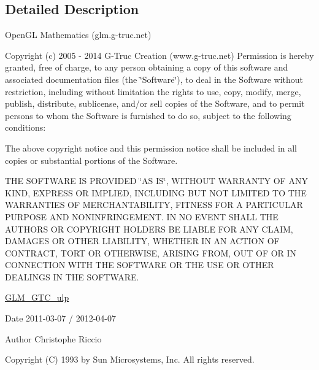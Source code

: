 \begin{DoxyCompactItemize}
\end{DoxyCompactItemize}


\subsection{Detailed Description}
Open\-G\-L Mathematics (glm.\-g-\/truc.\-net)

Copyright (c) 2005 -\/ 2014 G-\/\-Truc Creation (www.\-g-\/truc.\-net) Permission is hereby granted, free of charge, to any person obtaining a copy of this software and associated documentation files (the \char`\"{}\-Software\char`\"{}), to deal in the Software without restriction, including without limitation the rights to use, copy, modify, merge, publish, distribute, sublicense, and/or sell copies of the Software, and to permit persons to whom the Software is furnished to do so, subject to the following conditions\-:

The above copyright notice and this permission notice shall be included in all copies or substantial portions of the Software.

T\-H\-E S\-O\-F\-T\-W\-A\-R\-E I\-S P\-R\-O\-V\-I\-D\-E\-D \char`\"{}\-A\-S I\-S\char`\"{}, W\-I\-T\-H\-O\-U\-T W\-A\-R\-R\-A\-N\-T\-Y O\-F A\-N\-Y K\-I\-N\-D, E\-X\-P\-R\-E\-S\-S O\-R I\-M\-P\-L\-I\-E\-D, I\-N\-C\-L\-U\-D\-I\-N\-G B\-U\-T N\-O\-T L\-I\-M\-I\-T\-E\-D T\-O T\-H\-E W\-A\-R\-R\-A\-N\-T\-I\-E\-S O\-F M\-E\-R\-C\-H\-A\-N\-T\-A\-B\-I\-L\-I\-T\-Y, F\-I\-T\-N\-E\-S\-S F\-O\-R A P\-A\-R\-T\-I\-C\-U\-L\-A\-R P\-U\-R\-P\-O\-S\-E A\-N\-D N\-O\-N\-I\-N\-F\-R\-I\-N\-G\-E\-M\-E\-N\-T. I\-N N\-O E\-V\-E\-N\-T S\-H\-A\-L\-L T\-H\-E A\-U\-T\-H\-O\-R\-S O\-R C\-O\-P\-Y\-R\-I\-G\-H\-T H\-O\-L\-D\-E\-R\-S B\-E L\-I\-A\-B\-L\-E F\-O\-R A\-N\-Y C\-L\-A\-I\-M, D\-A\-M\-A\-G\-E\-S O\-R O\-T\-H\-E\-R L\-I\-A\-B\-I\-L\-I\-T\-Y, W\-H\-E\-T\-H\-E\-R I\-N A\-N A\-C\-T\-I\-O\-N O\-F C\-O\-N\-T\-R\-A\-C\-T, T\-O\-R\-T O\-R O\-T\-H\-E\-R\-W\-I\-S\-E, A\-R\-I\-S\-I\-N\-G F\-R\-O\-M, O\-U\-T O\-F O\-R I\-N C\-O\-N\-N\-E\-C\-T\-I\-O\-N W\-I\-T\-H T\-H\-E S\-O\-F\-T\-W\-A\-R\-E O\-R T\-H\-E U\-S\-E O\-R O\-T\-H\-E\-R D\-E\-A\-L\-I\-N\-G\-S I\-N T\-H\-E S\-O\-F\-T\-W\-A\-R\-E.

\hyperlink{group__gtc__ulp}{G\-L\-M\-\_\-\-G\-T\-C\-\_\-ulp}

\begin{DoxyDate}{Date}
2011-\/03-\/07 / 2012-\/04-\/07 
\end{DoxyDate}
\begin{DoxyAuthor}{Author}
Christophe Riccio
\end{DoxyAuthor}
Copyright (C) 1993 by Sun Microsystems, Inc. All rights reserved.

